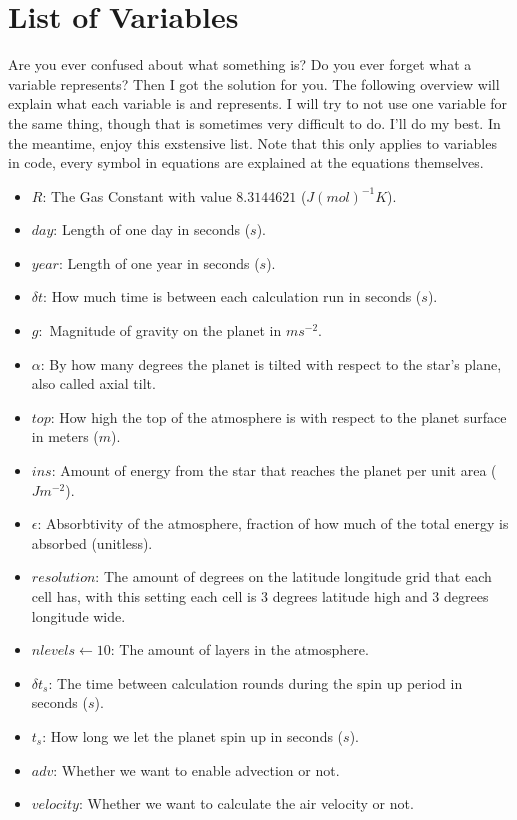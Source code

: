 \section{List of Variables}
Are you ever confused about what something is? Do you ever forget what a variable represents? Then I got the solution for you. The following overview will explain what each variable is and 
represents. I will try to not use one variable for the same thing, though that is sometimes very difficult to do. I'll do my best. In the meantime, enjoy this exstensive list. Note that this 
only applies to variables in code, every symbol in equations are explained at the equations themselves.

\begin{itemize}
    \item $R$: The Gas Constant with value $8.3144621$ ($J(mol)^{-1}K$).
    \item $day$: Length of one day in seconds ($s$).
    \item $year$: Length of one year in seconds ($s$).
    \item $\delta t$: How much time is between each calculation run in seconds ($s$).
    \item $g:$ Magnitude of gravity on the planet in $ms^{-2}$.
    \item $\alpha$: By how many degrees the planet is tilted with respect to the star's plane, also called axial tilt.
    \item $top$: How high the top of the atmosphere is with respect to the planet surface in meters ($m$).
    \item $ins$: Amount of energy from the star that reaches the planet per unit area ($Jm^{-2}$).
    \item $\epsilon$: Absorbtivity of the atmosphere, fraction of how much of the total energy is absorbed (unitless).
    \item $resolution$: The amount of degrees on the latitude longitude grid that each cell has, with this setting each cell is 3 degrees latitude high and 3 degrees longitude wide.
    \item $nlevels \leftarrow 10$: The amount of layers in the atmosphere.
    \item $\delta t_s$: The time between calculation rounds during the spin up period in seconds ($s$).
    \item $t_s$: How long we let the planet spin up in seconds ($s$).
    \item $adv$: Whether we want to enable advection or not.
    \item $velocity$: Whether we want to calculate the air velocity or not.

\end{itemize}
